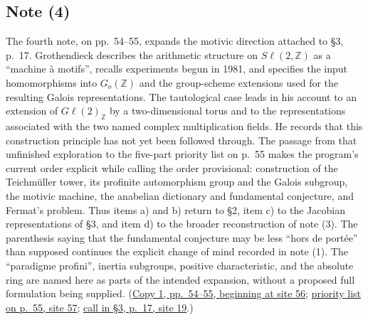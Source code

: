 \documentclass[11pt,a4paper]{article}
\begin{document}
\subsection*{Note (4)}
The fourth note, on pp.~54--55, expands the motivic direction attached to
\S3, p.~17. Grothendieck describes the arithmetic structure on
$S\ell(2,\mathbb Z)$ as a ``machine à motifs'', recalls experiments begun
in 1981, and specifies the input homomorphisms into $G_o(\mathbb Z)$ and
the group-scheme extensions used for the resulting Galois
representations. The tautological case leads in his account to an
extension of $G\ell(2)_{\mathbb Z}$ by a two-dimensional torus and to the
representations associated with the two named complex multiplication
fields. He records that this construction principle has not yet been
followed through. The passage from that unfinished exploration to the
five-part priority list on p.~55 makes the program's current order
explicit while calling the order provisional: construction of the
Teichmüller tower, its profinite automorphism group and the Galois
subgroup, the motivic machine, the anabelian dictionary and fundamental
conjecture, and Fermat's problem. Thus items a) and b) return to \S2,
item c) to the Jacobian representations of \S3, and item d) to the broader
reconstruction of note (3). The parenthesis saying that the fundamental
conjecture may be less ``hors de portée'' than supposed continues the
explicit change of mind recorded in note (1). The ``paradigme profini'',
inertia subgroups, positive characteristic, and the absolute ring are
named here as parts of the intended expansion, without a proposed full
formulation being supplied.
(\href{https://grothendieck.umontpellier.fr/web/viewer.html?file=../119.pdf\#page=57}{Copy 1, pp.~54--55, beginning at site 56};
\href{https://grothendieck.umontpellier.fr/web/viewer.html?file=../119.pdf\#page=58}{priority list on p.~55, site 57};
\href{https://grothendieck.umontpellier.fr/web/viewer.html?file=../119.pdf\#page=20}{call in \S3, p.~17, site 19}.)
\end{document}
